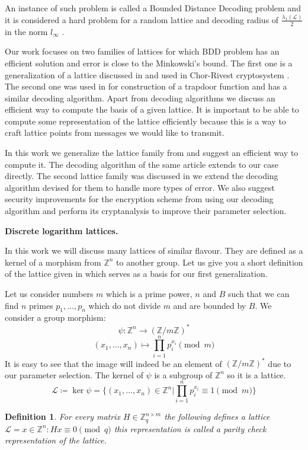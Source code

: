 \documentclass[12pt]{article}
\newcommand{\ZZ}{\mathbb{Z}}
\newcommand{\LL}{\mathcal{L}}
\newtheorem{definition}{Definition}
\begin{document}
An instance of such problem is called a Bounded Distance Decoding problem and it is considered a hard problem for a random lattice and decoding radius of $\frac{\lambda_{1}(\LL)}{2}$ in the norm $l_{\infty}$ \cite{[LM09]}.

Our work focuses on two families of lattices for which BDD problem has an efficient solution and error is close to the Minkowski's bound. The first one is a generalization of a lattice discussed in \cite{[DP19]} and used in Chor-Rivest cryptosystem \cite{[CR88]}. The second one was used in \cite{[LLXY17]} for construction of a trapdoor function and has a similar decoding algorithm. Apart from decoding algorithms we discuss an efficient way to compute the basis of a given lattice. It is important to be able to compute some representation of the lattice efficiently because this is a way to craft lattice points from messages we would like to transmit.

In this work we generalize the lattice family from \cite{[DP19]} and suggest an efficient way to compute it. The decoding algorithm of the same article extends to our case directly. The second lattice family was discussed in \cite{[LLXY17]} we extend the decoding algorithm devised for them to handle more types of error. We also suggest security improvements for the encryption scheme from \cite{[LLXY17]} using our decoding algorithm and perform its cryptanalysis to improve their parameter selection.

\textbf{Discrete logarithm lattices.}

In this work we will discuss many lattices of similar flavour. They are defined as a kernel of a morphism from $\ZZ^{n}$ to another group. Let us give you a short definition of the lattice given in \cite{[DP19]} which serves as a basis for our first generalization.

Let us consider numbers $m$ which is a prime power, $n$ and $B$ such that we can find $n$ primes $p_{1}, \dots , p_{n}$ which do not divide $m$ and are bounded by $B$. We consider a group morphism:
\[
    \psi : \ZZ^{n} \rightarrow (\ZZ/m\ZZ)^*
\]
\[
    (x_{1}, \dots, x_{n}) \mapsto \prod_{i=1}^{n}p_{i}^{x_{i}} \pmod{m}
\]
It is easy to see that the image will indeed be an element of $(\ZZ/m\ZZ)^*$ due to our parameter selection. The kernel of $\psi$ is a subgroup of $\ZZ^{n}$ so it is a lattice.
\[
    \LL \coloneqq \ker \psi = \{(x_{1}, \dots, x_{n}) \in \ZZ^{n} | \prod_{i=1}^{n}p_{i}^{x_{i}} \equiv 1 \pmod{m}\}
\]

\begin{definition}
For every matrix $H \in \ZZ_{q}^{n \times m}$ the following defines a lattice$\LL = {x \in \ZZ^{n}: Hx \equiv 0 \pmod{q}}$ this representation is called a parity check representation of the lattice.
\end{definition}
\end{document}
